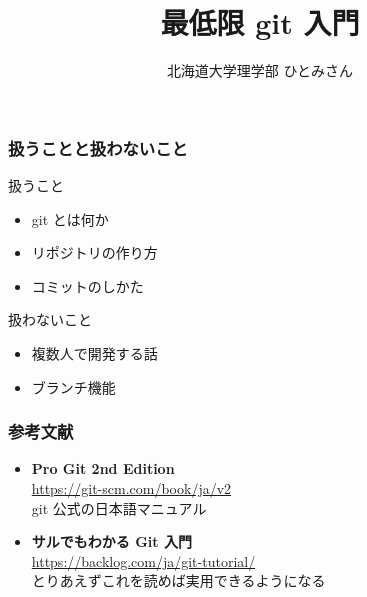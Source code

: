 
\newcommand{\centeralign}[1]{\rule{0pt}{0pt}\hfill#1\hfill\rule{0pt}{0pt}}
\newcommand{\typecommand}[1]{\colorbox{darkgray}{{\ttfamily\color{lime}#1}}}

\setlength{\parskip}{2ex}

\title{最低限 git 入門}
\author{北海道大学理学部 ひとみさん}
\date{\warekitoday}



\frame{\maketitle}

\begin{frame}
	\frametitle{扱うことと扱わないこと}
	\begin{block}{扱うこと}
		\begin{itemize}
			\item git とは何か
			\item リポジトリの作り方
			\item コミットのしかた
		\end{itemize}
	\end{block}
	\begin{block}{扱わないこと}
		\begin{itemize}
			\item 複数人で開発する話
			\item ブランチ機能
		\end{itemize}
	\end{block}
\end{frame}

\begin{frame}
	\frametitle{参考文献}
	\begin{itemize}
		\item \textbf{Pro Git 2nd Edition}\\
			\url{https://git-scm.com/book/ja/v2}\\
			git 公式の日本語マニュアル
		\item \textbf{サルでもわかる Git 入門}\\
			\url{https://backlog.com/ja/git-tutorial/}\\
			とりあえずこれを読めば実用できるようになる
	\end{itemize}
\end{frame}

